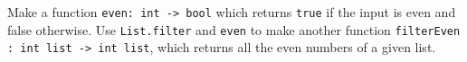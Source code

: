 Make a function \lstinline{even: int -> bool} which returns \lstinline{true} if the input is even and false otherwise. Use \lstinline{List.filter} and \lstinline{even} to make another function \lstinline{filterEven : int list -> int list}, which returns all the even numbers of a given list.
